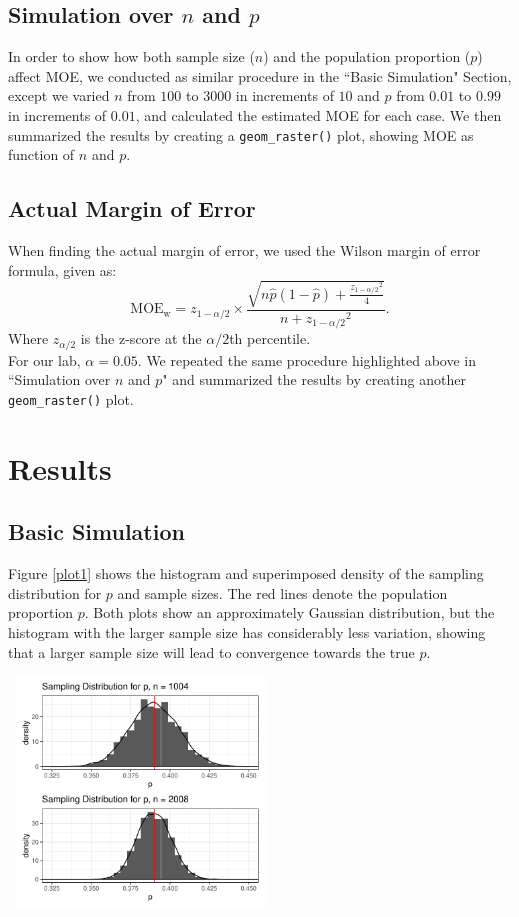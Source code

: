 \documentclass{article}\usepackage[]{graphicx}\usepackage[]{xcolor}
\newenvironment{Figure}
  {\par\medskip\noindent\minipage{\linewidth}}
  {\endminipage\par\medskip}
\begin{document}
\begin{multicols}{2}
\subsection{Simulation over $n$ and $p$}
In order to show how both sample size ($n$) and the population proportion ($p$) affect MOE, we conducted as similar procedure in the ``Basic Simulation" Section, except we varied $n$ from $100$ to $3000$ in increments of $10$ and $p$ from $0.01$ to $0.99$ in increments of $0.01$, and calculated the estimated MOE for each case. We then summarized the results by creating a \verb|geom_raster()| plot, showing MOE as function of $n$ and $p$. 

\subsection{Actual Margin of Error}
When finding the actual margin of error, we used the Wilson margin of error formula, given as: 
\[
\text{MOE}_{\text{w}} = z_{1-\alpha/2} \times \frac{ \sqrt{ n\hat{p}(1-\hat{p}) + \frac{{z_{1-\alpha/2}}^2}{4} } }{ n + {z_{1-\alpha/2}}^2 }
.\]
Where $z_{\alpha/2}$ is the z-score at the $\alpha/2$th percentile. \\
\indent For our lab, $\alpha =0.05$. We repeated the same procedure highlighted above in ``Simulation over $n$ and $p$" and summarized the results by creating another \verb|geom_raster()| plot. 

\section{Results}
\subsection{Basic Simulation}
Figure \ref{plot1} shows the histogram and superimposed density of the sampling distribution for $p$ and sample sizes. The red lines denote the population proportion $p$. Both plots show an approximately Gaussian distribution, but the histogram with the larger sample size has considerably less variation, showing that a larger sample size will lead to convergence towards the true $p$. 
\begin{Figure}
\centering
\includegraphics[width = 7cm, height = 6.15cm]{task1plots.pdf}
 \label{plot1}
\end{Figure}


\end{multicols}
\end{document}

